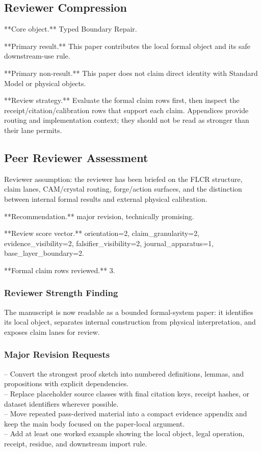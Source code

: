 \documentclass[11pt]{article}
\begin{document}
\subsection*{Reviewer Compression}

**Core object.** Typed Boundary Repair.

**Primary result.** This paper contributes the local formal object and its safe downstream-use rule.

**Primary non-result.** This paper does not claim direct identity with Standard Model or physical objects.

**Review strategy.** Evaluate the formal claim rows first, then inspect the receipt/citation/calibration rows that support each claim. Appendices provide routing and implementation context; they should not be read as stronger than their lane permits.

\subsection*{Peer Reviewer Assessment}

Reviewer assumption: the reviewer has been briefed on the FLCR structure, claim lanes, CAM/crystal routing, forge/action surfaces, and the distinction between internal formal results and external physical calibration.

**Recommendation.** major revision, technically promising.

**Review score vector.** orientation=2, claim\_granularity=2, evidence\_visibility=2, falsifier\_visibility=2, journal\_apparatus=1, base\_layer\_boundary=2.

**Formal claim rows reviewed.** 3.

\subsubsection*{Reviewer Strength Finding}

The manuscript is now readable as a bounded formal-system paper: it identifies its local object, separates internal construction from physical interpretation, and exposes claim lanes for review.

\subsubsection*{Major Revision Requests}

\noindent{}-- Convert the strongest proof sketch into numbered definitions, lemmas, and propositions with explicit dependencies.\\
\noindent{}-- Replace placeholder source classes with final citation keys, receipt hashes, or dataset identifiers wherever possible.\\
\noindent{}-- Move repeated pass-derived material into a compact evidence appendix and keep the main body focused on the paper-local argument.\\
\noindent{}-- Add at least one worked example showing the local object, legal operation, receipt, residue, and downstream import rule.\\
\end{document}
